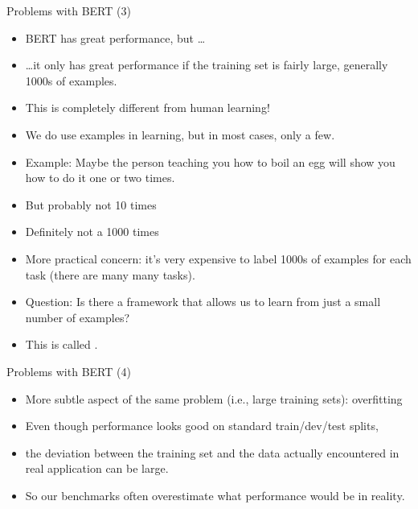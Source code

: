 
\begin{frame}{Problems with BERT (3)}

\vfill

  \begin{itemize}
\item BERT has great performance, but \ldots
\item \ldots it only has great performance if the
training set is fairly large, generally 1000s of examples.
\item This is completely different from human learning!
\item We do use examples in learning, but in most
cases, only a few.
\item Example: Maybe the person teaching you how to
boil an egg will show you how to do it one or two times.
\item
But
probably not 10 times
\item
Definitely not a 1000 times 
\item More practical concern: it's very expensive to
label 1000s of examples for each task (there are many  many tasks).
\item Question: Is there a framework that allows us to
learn from just a small number of examples?
\item This is called .
    \end{itemize}

\vfill

\end{frame}


\begin{frame}{Problems with BERT (4)}

\vfill

  \begin{itemize}
\item More subtle aspect of the same problem (i.e.,
large training sets): overfitting
\item Even though performance looks good on standard
train/dev/test splits, 
\item the deviation between the training set and the
data actually encountered in real application can be large.
\item So our benchmarks often overestimate what
performance would be in reality.
    \end{itemize}

\vfill

\end{frame}


\endlecture

